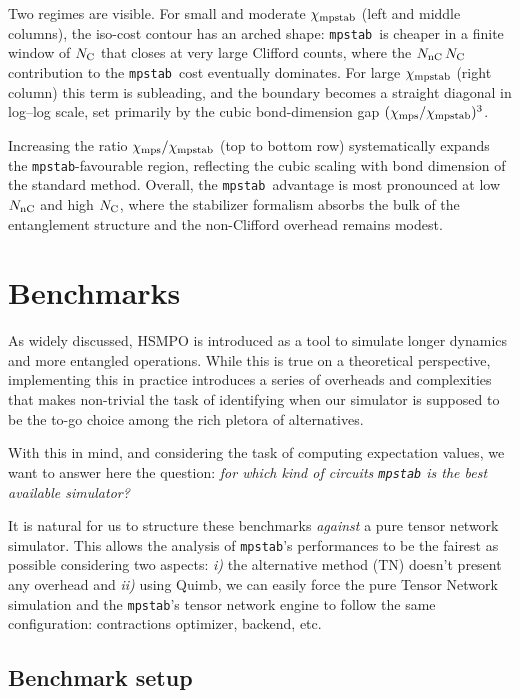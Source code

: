 \documentclass[pra,aps,twocolumn,longbibliography,preprintnumbers,superscriptaddress,nofootnotebib,10pt]{revtex4-2}
\newcommand{\numcliff}{{N_{\rm C}}} %
\newcommand{\nummagic}{{N_{\rm nC}}} %
\newcommand{\mpstab}{\texttt{mpstab}}
\begin{document}
Two regimes are visible. For small and moderate $\chi_{\rm mpstab}$ (left 
and middle columns), the iso-cost contour has an arched shape: \mpstab\ is 
cheaper in a finite window of $\numcliff$ that closes at very large Clifford 
counts, where the $\nummagic \, \numcliff$ contribution to the \mpstab\ cost 
eventually dominates. For large $\chi_{\rm mpstab}$ (right column) this term 
is subleading, and the boundary becomes a straight diagonal in log--log 
scale, set primarily by the cubic bond-dimension gap 
$(\chi_{\rm mps}/\chi_{\rm mpstab})^3$.


Increasing the ratio $\chi_{\rm mps}/\chi_{\rm mpstab}$ (top to bottom row) 
systematically expands the \mpstab-favourable region, reflecting the cubic 
scaling with bond dimension of the standard method. Overall, the \mpstab\ 
advantage is most pronounced at low $\nummagic$ and high $\numcliff$, where 
the stabilizer formalism absorbs the bulk of the entanglement structure and 
the non-Clifford overhead remains modest.

\section{Benchmarks}

As widely discussed, HSMPO is introduced as a tool to simulate longer dynamics 
and more entangled operations. While this is true on a theoretical perspective, 
implementing this in practice introduces a series of overheads and complexities 
that makes non-trivial the task of identifying when our simulator is supposed 
to be the to-go choice among the rich pletora of alternatives. 

With this in mind, and considering the task of computing expectation values, 
we want to answer here the question: \textit{for which kind of circuits 
\texttt{mpstab} is the best available simulator?} 

It is natural for us to structure these benchmarks \textit{against} a pure 
tensor network simulator. This allows the analysis of \texttt{mpstab}'s 
performances to be the fairest as possible considering two aspects: 
\textit{i)} the alternative method (TN) doesn't present any overhead and 
\textit{ii)} using Quimb, we can easily force the pure Tensor Network 
simulation and the \texttt{mpstab}'s tensor network engine to follow the same 
configuration: contractions optimizer, backend, etc.

\subsection{Benchmark setup}
\label{sec:bench_setup}
\end{document}
